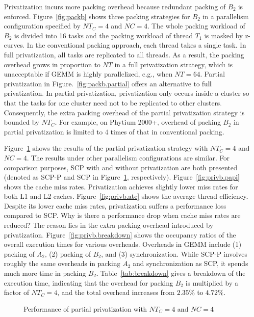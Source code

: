 Privatization incurs more packing overhead because
redundant packing of $B_2$ is enforced.
Figure~\ref{fig:packb} shows three packing strategies for $B_2$
in a parallelism configuration specified by
$NT_C=4$ and $NC=4$.
The whole packing workload of $B_2$ is divided into 16 tasks
and the packing workload of thread $T_1$ is masked by z-curves. 
In the conventional packing approach, each thread takes a single task.
In full privatization, all tasks are replicated to all threads.
As a result, the packing overhead grows in proportion to $NT$
in a full privatization strategy, which is unacceptable
if GEMM is highly parallelized, e.g., when $NT=64$.
Partial privatization in Figure.~\ref{fig:packb.partial}
offers an alternative to full privatization.
In partial privatization, privatization only occurs inside
a cluster so that the tasks for one cluster need not to be
replicated to other clusters.
Consequently,  the extra packing overhead of the partial privatization
strategy is bounded by $NT_C$.
For example, on Phytium 2000+, overhead of packing $B_2$
in partial privatization is limited to 4 times
of that in conventional packing.

Figure~\ref{fig:privb} shows the results of the partial
privatization strategy with $NT_C=4$ and $NC=4$.
The results under other parallelism configurations are similar.
For comparison purposes,
SCP with and without privatization are both presented
(denoted as SCP-P and SCP in Figure~\ref{fig:privb}, respectively).
Figure~\ref{fig:privb.papi} shows the cache miss rates.
Privatization achieves slightly lower miss rates for
both L1 and L2 caches.
Figure~\ref{fig:privb.ate} shows the average thread efficiency.
Despite its lower cache miss rates,
privatization suffers a performance loss compared to SCP.
Why is there a performance drop when cache miss rates 
are reduced?
The reason lies in the extra packing overhead introduced by privatization.
Figure~\ref{fig:privb.breakdown} shows the occupancy
ratios of the overall execution times for various overheads.
Overheads in GEMM include
(1) packing of $A_2$, (2) packing of $B_2$,
and (3) synchronization.
While SCP-P involves roughly the same overheads in
packing $A_2$ and synchronization as SCP,
it spends much more time in packing $B_2$.
Table~\ref{tab:breakdown} gives a breakdown of the
execution time, indicating that the overhead for packing $B_2$
is multiplied by a factor of $NT_C=4$,
and the total overhead increases from $2.35\%$ to $4.72\%$.

\begin{figure}
  \centering
  \caption{Performance of partial privatization with $NT_C=4$ and $NC=4$}
  \label{fig:privb}
\end{figure}

